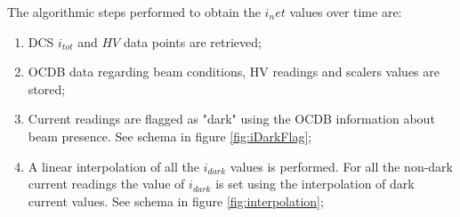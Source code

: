 The algorithmic steps performed to obtain the $i_net$ values over time are:
\begin{enumerate}
\item DCS $i_{tot}$ and $HV$ data points are retrieved;
\item OCDB data regarding beam conditions, HV readings and scalers values are stored;
\item Current readings are flagged as "dark" using the OCDB information about beam presence. See schema in figure \ref{fig:iDarkFlag};
\item A linear interpolation of all the $i_{dark}$ values is performed. 
For all the non-dark current readings the value of $i_{dark}$ is set using the interpolation of dark current values. See schema in figure \ref{fig:interpolation};
\end{enumerate}

